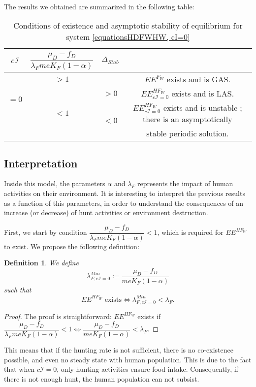 \documentclass{article}
\newcommand{\lfw}{\lambda_{F}}
\newcommand{\lfw}{\lambda_{F}}
\newcommand{\cI}{c \mathcal{I}}
\newtheorem{definition}{Definition}
\begin{document}
The results we obtained are summarized in the following table:
\begin{table}[!ht]
\centering
\def\arraystretch{2}
\begin{tabular}{c|c|c|c}
$\cI$ & $\dfrac{\mu_D - f_D}{\lfw m e K_F(1-\alpha)}$ &  $\Delta_{Stab}$ & \\
\hline
\multirow{3}{*}{$=0$} & $ > 1$ & &$EE^{F_W}$ exists and is GAS.  \\
\cline{2-4}
 & \multirow{3}{*}{$< 1$} & $>0$ &$EE^{HF_W}_{\cI=0}$ exists and is LAS.\\
 \cline{3-4}
 & & \multirow{2}{*}{$ < 0$} & $EE^{HF_W}_{\cI=0}$ exists and is unstable ; there is an asymptotically \\
 & & &  stable periodic solution.
\end{tabular}
\caption{\centering Conditions of existence and asymptotic stability of equilibrium for system \eqref{equationsHDFWHW, cI=0}}
\end{table}


\subsection{Interpretation}
Inside this model, the parameters $\alpha$ and $\lfw$ represents the impact of human activities on their environment. It is interesting to interpret the previous results as a function of this parameters, in order to understand the consequences of an increase (or decrease) of hunt activities or environment destruction.

First, we start by condition $\dfrac{\mu_D - f_D}{\lfw m e K_F(1-\alpha)} < 1$, which is required for $EE^{HF_W}$ to exist. We propose the following definition:

\begin{definition} We define 
$$\lambda_{F, \cI=0}^{Min} := \dfrac{\mu_D - f_D}{m e K_F(1-\alpha)}$$
such that 
$$
\text{$EE^{HF_W}$ exists} \Leftrightarrow \lambda_{F, \cI=0}^{Min}  <  \lfw.
$$
\end{definition}
\begin{proof}
The proof is straightforward: $EE^{HF_W}$ exists if $\dfrac{\mu_D - f_D}{\lfw m e K_F(1-\alpha)} < 1 \Leftrightarrow \dfrac{\mu_D - f_D}{ m e K_F(1-\alpha)} < \lfw$.
\end{proof}

This means that if the hunting rate is not sufficient, there is no co-existence possible, and even no steady state with human population. This is due to the fact that when $\cI = 0$, only hunting activities ensure food intake. Consequently, if there is not enough hunt, the human population can not subsist.
\end{document}
